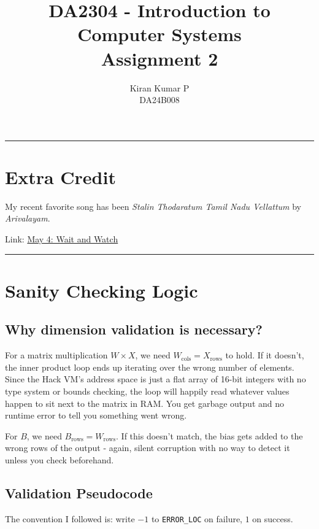 \documentclass[12pt,a4paper]{article}
\title{%
    \textbf{DA2304 - Introduction to Computer Systems} \\[0.5em]
    \textbf{ Assignment 2}
}
\author{Kiran Kumar P \\
        DA24B008
        }
\date{}
\begin{document}
\maketitle

\hrule

\section*{Extra Credit}

My recent favorite song has been \textit{Stalin Thodaratum Tamil Nadu Vellattum} by \textit{Arivalayam}.  

\noindent
Link: \href{https://youtu.be/cGDoVZmeg5I?si=BldBGriqk_Dvbyse}{May 4: Wait and Watch}

\vspace{1em}
\hrule
\vspace{1em}
\section{Sanity Checking Logic}

\subsection{Why dimension validation is necessary?}

For a matrix multiplication $W \times X$, we need \textbf{$W_{\text{cols}} = X_{\text{rows}}$} to hold. If it doesn't, the inner product loop ends up iterating over the wrong number of elements. Since the Hack VM's address space is just a flat array of 16-bit integers with no type system or bounds checking, the loop will happily read whatever values happen to sit next to the matrix in RAM. You get garbage output and no runtime error to tell you something went wrong.

For $B$, we need \textbf{$B_{\text{rows}} = W_{\text{rows}}$}. If this doesn't match, the bias gets added to the wrong rows of the output - again, silent corruption with no way to detect it unless you check beforehand.

\subsection{Validation Pseudocode}

The convention I followed is: write $-1$ to \texttt{ERROR\_LOC} on failure, $1$ on success.
\end{document}
